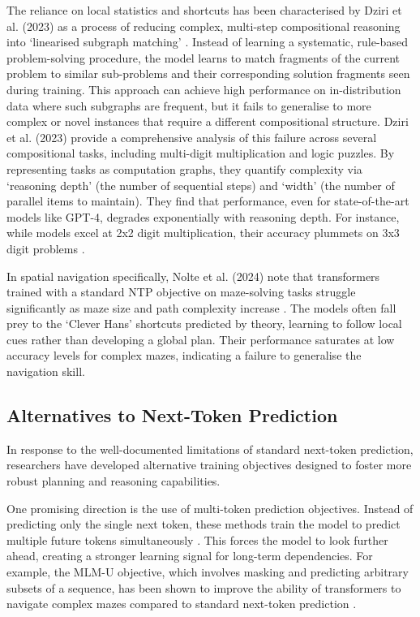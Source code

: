 The reliance on local statistics and shortcuts has been characterised by Dziri et al. (2023) as a process of reducing complex, multi-step compositional reasoning into `linearised subgraph matching' \citep{dziri2023faithfatelimitstransformers}. Instead of learning a systematic, rule-based problem-solving procedure, the model learns to match fragments of the current problem to similar sub-problems and their corresponding solution fragments seen during training. This approach can achieve high performance on in-distribution data where such subgraphs are frequent, but it fails to generalise to more complex or novel instances that require a different compositional structure. Dziri et al. (2023) provide a comprehensive analysis of this failure across several compositional tasks, including multi-digit multiplication and logic puzzles. By representing tasks as computation graphs, they quantify complexity via `reasoning depth' (the number of sequential steps) and `width' (the number of parallel items to maintain). They find that performance, even for state-of-the-art models like GPT-4, degrades exponentially with reasoning depth. For instance, while models excel at 2x2 digit multiplication, their accuracy plummets on 3x3 digit problems \citep{dziri2023faithfatelimitstransformers}.

In spatial navigation specifically, Nolte et al. (2024) note that transformers trained with a standard NTP objective on maze-solving tasks struggle significantly as maze size and path complexity increase \citep{nolte2024spatial}. The models often fall prey to the `Clever Hans' shortcuts predicted by theory, learning to follow local cues rather than developing a global plan. Their performance saturates at low accuracy levels for complex mazes, indicating a failure to generalise the navigation skill.

\subsection{Alternatives to Next-Token Prediction}

In response to the well-documented limitations of standard next-token prediction, researchers have developed alternative training objectives designed to foster more robust planning and reasoning capabilities.

One promising direction is the use of multi-token prediction objectives. Instead of predicting only the single next token, these methods train the model to predict multiple future tokens simultaneously \cite{gloeckle2024betterfasterlarge}. This forces the model to look further ahead, creating a stronger learning signal for long-term dependencies. For example, the MLM-U objective, which involves masking and predicting arbitrary subsets of a sequence, has been shown to improve the ability of transformers to navigate complex mazes compared to standard next-token prediction \citep{kitouni2024factorizationcursetokenspredict}.

